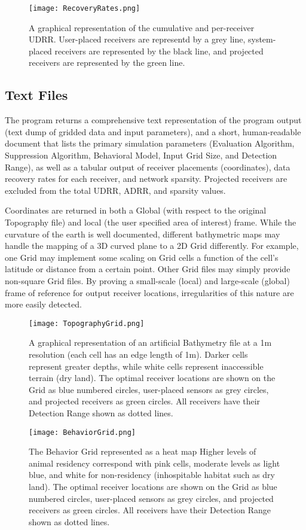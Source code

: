 \begin{figure}[ht]
	\texttt{[image: RecoveryRates.png]}
	\caption{\label{recoveryGraph} A graphical representation of the cumulative and per-receiver UDRR.  User-placed receivers are representd by a grey line, system-placed receivers are represented by the black line, and projected receivers are represented by the green line.} 
\end{figure}

\subsection{Text Files}
The program returns a comprehensive text representation of the program output (text dump of gridded data and input parameters), and a short, human-readable document that lists the primary simulation parameters (Evaluation Algorithm, Suppression Algorithm, Behavioral Model, Input Grid Size, and Detection Range), as well as a tabular output of receiver placements (coordinates), data recovery rates for each receiver, and network sparsity.  Projected receivers are excluded from the total UDRR, ADRR, and sparsity values.

Coordinates are returned in both a Global (with respect to the original Topography file) and local (the user specified area of interest) frame.  While the curvature of the earth is well documented, different bathymetric maps may handle the mapping of a 3D curved plane to a 2D Grid differently.  For example, one Grid may implement some scaling on Grid cells a function of the cell's latitude or distance from a certain point.  Other Grid files may simply provide non-square Grid files.  By proving a small-scale (local) and large-scale (global) frame of reference for output receiver locations, irregularities of this nature are more easily detected.

\begin{figure}[ht]
	\texttt{[image: TopographyGrid.png]}
	\caption{A graphical representation of an artificial Bathymetry file at a 1m resolution (each cell has an edge length of 1m).  Darker cells represent greater depths, while white cells represent inaccessible terrain (dry land).  The optimal receiver locations are shown on the Grid as blue numbered circles, user-placed sensors as grey circles, and projected receivers as green circles.  All receivers have their Detection Range shown as dotted lines.\label{bathyGraph}}
\end{figure}

\begin{figure}[ht]
	\texttt{[image: BehaviorGrid.png]}
	\caption{The Behavior Grid represented as a heat map  Higher levels of animal residency correspond with pink cells, moderate levels as light blue, and white for non-residency (inhospitable habitat such as  dry land).  The optimal receiver locations are shown on the Grid as blue numbered circles, user-placed sensors as grey circles, and projected receivers as green circles.  All receivers have their Detection Range shown as dotted lines.\label{animalGraph}}
\end{figure}

